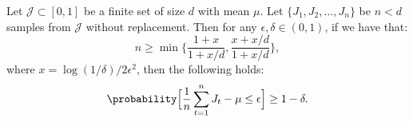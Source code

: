 \begin{lemma}
    \label{lemma:sampling:boundedme:concentration}
    Let $\mathcal{J} \subset [0, 1]$ be a finite set of size $d$
    with mean $\mu$. Let $\{J_1, J_2, \ldots, J_n\}$ be $n < d$
    samples from $\mathcal{J}$ without replacement.
    Then for any $\epsilon, \delta \in (0, 1)$, if we have that:
    \begin{equation*}
        n \geq \min \Big\{ \frac{1 + x}{1 + x/d}, \frac{x + x/d}{1 + x/d} \Big\},
    \end{equation*}
    where $x = \log(1/\delta)/2\epsilon^2$, then the following holds:
    \begin{equation*}
        \probability\Big[
            \frac{1}{n} \sum_{t = 1}^n J_t - \mu \leq \epsilon
        \Big] \geq 1 - \delta.
    \end{equation*}
\end{lemma}
